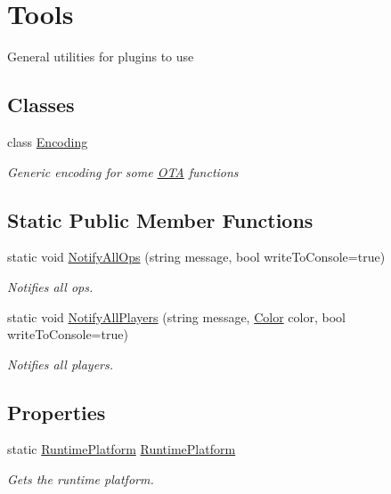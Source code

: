 \hypertarget{classOTA_1_1Tools}{}\section{Tools}
\label{classOTA_1_1Tools}


General utilities for plugins to use  


\subsection*{Classes}
\begin{DoxyCompactItemize}
\item 
class \hyperlink{classOTA_1_1Tools_1_1Encoding}{Encoding}
\begin{DoxyCompactList}\small\item\em Generic encoding for some \hyperlink{namespaceOTA}{O\+T\+A} functions \end{DoxyCompactList}\end{DoxyCompactItemize}
\subsection*{Static Public Member Functions}
\begin{DoxyCompactItemize}
\item 
static void \hyperlink{classOTA_1_1Tools_a892910825350cccf78d0fca02d1a16cf}{Notify\+All\+Ops} (string message, bool write\+To\+Console=true)
\begin{DoxyCompactList}\small\item\em Notifies all ops. \end{DoxyCompactList}\item 
static void \hyperlink{classOTA_1_1Tools_a983e54fb7b11e4070f5b37847a800ac8}{Notify\+All\+Players} (string message, \hyperlink{structMicrosoft_1_1Xna_1_1Framework_1_1Color}{Color} color, bool write\+To\+Console=true)
\begin{DoxyCompactList}\small\item\em Notifies all players. \end{DoxyCompactList}\end{DoxyCompactItemize}
\subsection*{Properties}
\begin{DoxyCompactItemize}
\item 
static \hyperlink{namespaceOTA_aba44b3a41f587d61c3dfecf49323c837}{Runtime\+Platform} \hyperlink{classOTA_1_1Tools_a467129bb7e940725811f8b7ef5fff16b}{Runtime\+Platform}
\begin{DoxyCompactList}\small\item\em Gets the runtime platform. \end{DoxyCompactList}\end{DoxyCompactItemize}


